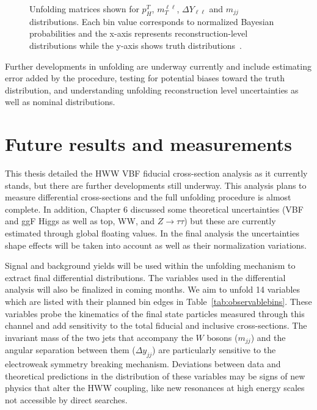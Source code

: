 \begin{figure}[!h]
{  }%
\caption{\label{fig:unfoldingmatrices}Unfolding matrices shown for $p^T_H$, $m_T^{\ell\ell}$, $\Delta Y_{\ell\ell}$ and $m_{jj}$ distributions. Each bin value corresponds to normalized Bayesian probabilities and the x-axis represents reconstruction-level distributions while the y-axis shows truth distributions~\cite{ourSupportNote}.}
\end{figure}  

Further developments in unfolding are underway currently and include estimating error added by the procedure, testing for potential biases toward the truth distribution, and understanding unfolding reconstruction level uncertainties as well as nominal distributions. 

\section{Future results and measurements}

This thesis detailed the HWW VBF fiducial cross-section analysis as it currently stands, but there are further developments still underway. This analysis plans to measure differential cross-sections and the full unfolding procedure is almost complete. In addition, Chapter 6 discussed some theoretical uncertainties (VBF and ggF Higgs as well as top, WW, and $Z\rightarrow \tau\tau$) but these are currently estimated through global floating values. In the final analysis the uncertainties shape effects will be taken into account as well as their normalization variations.  

Signal and background yields will be used within the unfolding mechanism to extract final differential distributions. The variables used in the differential analysis will also be finalized in coming months. We aim to unfold 14 variables which are listed with their planned bin edges in Table~\ref{tab:observablebins}. These variables probe the kinematics of the final state particles measured through this channel and add sensitivity to the total fiducial and inclusive cross-sections. The invariant mass of the two jets that accompany the $W$ bosons ($m_{jj}$) and the angular separation between them ($\Delta y_{jj}$) are particularly sensitive to the electroweak symmetry breaking mechanism. Deviations between data and theoretical predictions in the distribution of these variables may be signs of new physics that alter the HWW coupling, like new resonances at high energy scales not accessible by direct searches.                

